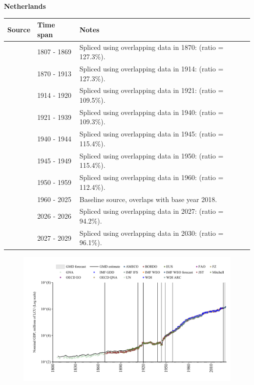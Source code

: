 \documentclass[12pt,a4paper,landscape]{article}
\begin{document}
\begin{adjustbox}{max totalsize={\paperwidth}{\paperheight},center}
\begin{minipage}[t][\textheight][t]{\textwidth}
\vspace*{0.5cm}
{}
\begin{center}
{\Large\bfseries Netherlands}
\end{center}
\vspace{0.5cm}
\begin{table}[H]
\centering
\small
\begin{tabular}{|l|l|l|}
\hline
\textbf{Source} & \textbf{Time span} & \textbf{Notes} \\
\hline
\rowcolor{white}\cite{GNA}& 1807 - 1869 &Spliced using overlapping data in 1870: (ratio = 127.3\%).\\
\rowcolor{lightgray}\cite{JST}& 1870 - 1913 &Spliced using overlapping data in 1914: (ratio = 127.3\%).\\
\rowcolor{white}\cite{Mitchell}& 1914 - 1920 &Spliced using overlapping data in 1921: (ratio = 109.5\%).\\
\rowcolor{lightgray}\cite{JST}& 1921 - 1939 &Spliced using overlapping data in 1940: (ratio = 109.3\%).\\
\rowcolor{white}\cite{Mitchell}& 1940 - 1944 &Spliced using overlapping data in 1945: (ratio = 115.4\%).\\
\rowcolor{lightgray}\cite{JST}& 1945 - 1949 &Spliced using overlapping data in 1950: (ratio = 115.4\%).\\
\rowcolor{white}\cite{IMF_GDD}& 1950 - 1959 &Spliced using overlapping data in 1960: (ratio = 112.4\%).\\
\rowcolor{lightgray}\cite{OECD_EO}& 1960 - 2025 &Baseline source, overlaps with base year 2018.\\
\rowcolor{white}\cite{AMECO}& 2026 - 2026 &Spliced using overlapping data in 2027: (ratio = 94.2\%).\\
\rowcolor{lightgray}\cite{IMF_WEO_forecast}& 2027 - 2029 &Spliced using overlapping data in 2030: (ratio = 96.1\%).\\
\hline
\end{tabular}
\end{table}
\begin{figure}[H]
\centering
\includegraphics[width=\textwidth,height=0.6\textheight,keepaspectratio]{graphs/NLD_nGDP.pdf}

\end{figure}
\end{minipage}
\end{adjustbox}
\end{document}
